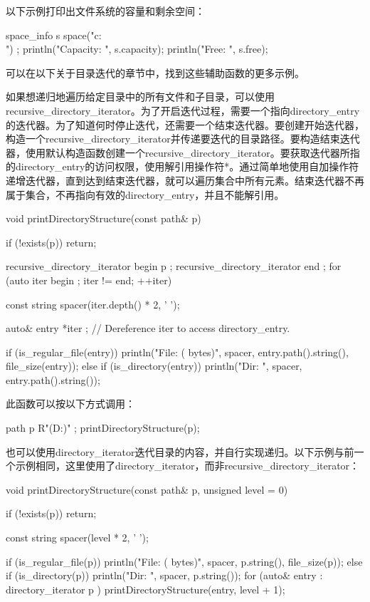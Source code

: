 以下示例打印出文件系统的容量和剩余空间：

\begin{cpp}
space_info s { space("c:\\") };
println("Capacity: {}", s.capacity);
println("Free: {}", s.free);
\end{cpp}

可以在以下关于目录迭代的章节中，找到这些辅助函数的更多示例。


如果想递归地遍历给定目录中的所有文件和子目录，可以使用recursive\_directory\_iterator。为了开启迭代过程，需要一个指向directory\_entry的迭代器。为了知道何时停止迭代，还需要一个结束迭代器。要创建开始迭代器，构造一个recursive\_directory\_iterator并传递要迭代的目录路径。要构造结束迭代器，使用默认构造函数创建一个recursive\_directory\_iterator。要获取迭代器所指的directory\_entry的访问权限，使用解引用操作符*。通过简单地使用自加操作符递增迭代器，直到达到结束迭代器，就可以遍历集合中所有元素。结束迭代器不再属于集合，不再指向有效的directory\_entry，并且不能解引用。

\begin{cpp}
void printDirectoryStructure(const path& p)
{
    if (!exists(p)) { return; }

    recursive_directory_iterator begin { p };
    recursive_directory_iterator end { };
    for (auto iter { begin }; iter != end; ++iter) {

        const string spacer(iter.depth() * 2, ' ');

        auto& entry { *iter }; // Dereference iter to access directory_entry.

        if (is_regular_file(entry)) {
            println("{}File: {} ({} bytes)",
            spacer, entry.path().string(), file_size(entry));
        } else if (is_directory(entry)) {
            println("{}Dir: {}", spacer, entry.path().string());
        }
    }
}
\end{cpp}

此函数可以按以下方式调用：

\begin{cpp}
path p { R"(D:\Foo\Bar)" };
printDirectoryStructure(p);
\end{cpp}

也可以使用directory\_iterator迭代目录的内容，并自行实现递归。以下示例与前一个示例相同，这里使用了directory\_iterator，而非recursive\_directory\_iterator：

\begin{cpp}
void printDirectoryStructure(const path& p, unsigned level = 0)
{
    if (!exists(p)) { return; }

    const string spacer(level * 2, ' ');

    if (is_regular_file(p)) {
        println("{}File: {} ({} bytes)", spacer, p.string(), file_size(p));
    } else if (is_directory(p)) {
        println("{}Dir: {}", spacer, p.string());
        for (auto& entry : directory_iterator { p }) {
            printDirectoryStructure(entry, level + 1);
        }
    }
}
\end{cpp}









